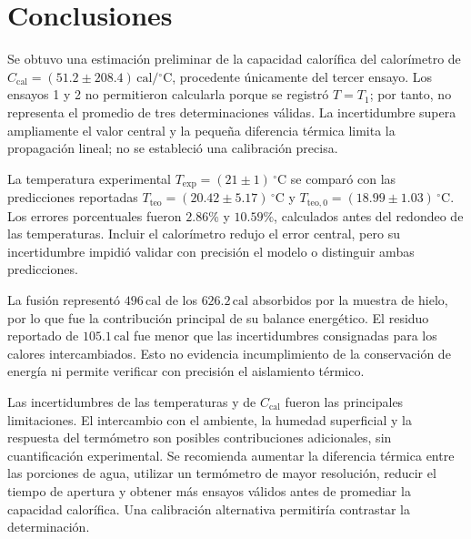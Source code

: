 \section{Conclusiones}

Se obtuvo una estimación preliminar de la capacidad calorífica del calorímetro de $C_{\mathrm{cal}}=(51.2\pm208.4)\,\mathrm{cal}/{}^{\circ}\mathrm{C}$, procedente únicamente del tercer ensayo. Los ensayos 1 y 2 no permitieron calcularla porque se registró $T=T_1$; por tanto, no representa el promedio de tres determinaciones válidas. La incertidumbre supera ampliamente el valor central y la pequeña diferencia térmica limita la propagación lineal; no se estableció una calibración precisa.

La temperatura experimental $T_{\mathrm{exp}}=(21\pm1)\,{}^{\circ}\mathrm{C}$ se comparó con las predicciones reportadas $T_{\mathrm{teo}}=(20.42\pm5.17)\,{}^{\circ}\mathrm{C}$ y $T_{\mathrm{teo},0}=(18.99\pm1.03)\,{}^{\circ}\mathrm{C}$. Los errores porcentuales fueron $2.86\%$ y $10.59\%$, calculados antes del redondeo de las temperaturas. Incluir el calorímetro redujo el error central, pero su incertidumbre impidió validar con precisión el modelo o distinguir ambas predicciones.

La fusión representó $496\,\mathrm{cal}$ de los $626.2\,\mathrm{cal}$ absorbidos por la muestra de hielo, por lo que fue la contribución principal de su balance energético. El residuo reportado de $105.1\,\mathrm{cal}$ fue menor que las incertidumbres consignadas para los calores intercambiados. Esto no evidencia incumplimiento de la conservación de energía ni permite verificar con precisión el aislamiento térmico.

Las incertidumbres de las temperaturas y de $C_{\mathrm{cal}}$ fueron las principales limitaciones. El intercambio con el ambiente, la humedad superficial y la respuesta del termómetro son posibles contribuciones adicionales, sin cuantificación experimental. Se recomienda aumentar la diferencia térmica entre las porciones de agua, utilizar un termómetro de mayor resolución, reducir el tiempo de apertura y obtener más ensayos válidos antes de promediar la capacidad calorífica. Una calibración alternativa permitiría contrastar la determinación.
